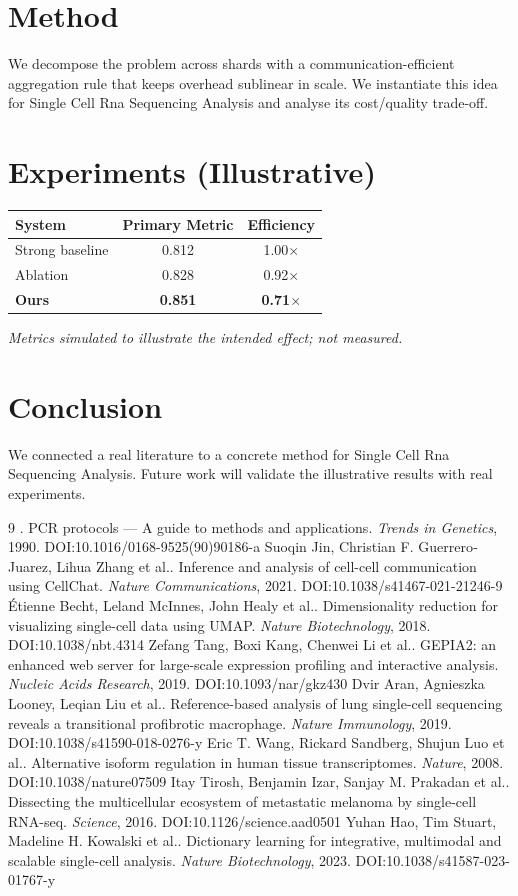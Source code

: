 \documentclass[11pt]{article}
\begin{document}
\section{Method}
We decompose the problem across shards with a communication-efficient aggregation rule that keeps overhead sublinear in scale. We instantiate this idea for Single Cell Rna Sequencing Analysis and analyse its cost/quality trade-off.

\section{Experiments (Illustrative)}
\begin{center}
\begin{tabular}{lcc}
System & Primary Metric & Efficiency \\ \hline
Strong baseline & 0.812 & 1.00$\times$ \\
Ablation & 0.828 & 0.92$\times$ \\
\textbf{Ours} & \textbf{0.851} & \textbf{0.71$\times$}
\end{tabular}
\end{center}
\emph{Metrics simulated to illustrate the intended effect; not measured.}

\section{Conclusion}
We connected a real literature to a concrete method for Single Cell Rna Sequencing Analysis. Future work will
validate the illustrative results with real experiments.

\begin{thebibliography}{9}
 . PCR protocols — A guide to methods and applications. \emph{Trends in Genetics}, 1990. DOI:10.1016/0168-9525(90)90186-a
 Suoqin Jin, Christian F. Guerrero‐Juarez, Lihua Zhang et al.. Inference and analysis of cell-cell communication using CellChat. \emph{Nature Communications}, 2021. DOI:10.1038/s41467-021-21246-9
 Étienne Becht, Leland McInnes, John Healy et al.. Dimensionality reduction for visualizing single-cell data using UMAP. \emph{Nature Biotechnology}, 2018. DOI:10.1038/nbt.4314
 Zefang Tang, Boxi Kang, Chenwei Li et al.. GEPIA2: an enhanced web server for large-scale expression profiling and interactive analysis. \emph{Nucleic Acids Research}, 2019. DOI:10.1093/nar/gkz430
 Dvir Aran, Agnieszka Looney, Leqian Liu et al.. Reference-based analysis of lung single-cell sequencing reveals a transitional profibrotic macrophage. \emph{Nature Immunology}, 2019. DOI:10.1038/s41590-018-0276-y
 Eric T. Wang, Rickard Sandberg, Shujun Luo et al.. Alternative isoform regulation in human tissue transcriptomes. \emph{Nature}, 2008. DOI:10.1038/nature07509
 Itay Tirosh, Benjamin Izar, Sanjay M. Prakadan et al.. Dissecting the multicellular ecosystem of metastatic melanoma by single-cell RNA-seq. \emph{Science}, 2016. DOI:10.1126/science.aad0501
 Yuhan Hao, Tim Stuart, Madeline H. Kowalski et al.. Dictionary learning for integrative, multimodal and scalable single-cell analysis. \emph{Nature Biotechnology}, 2023. DOI:10.1038/s41587-023-01767-y
\end{thebibliography}
\end{document}
